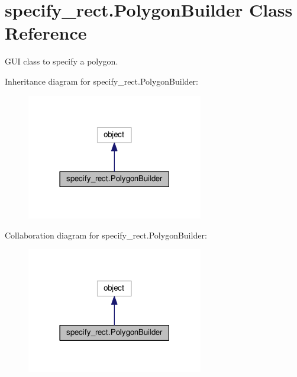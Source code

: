 \hypertarget{classspecify__rect_1_1_polygon_builder}{}\section{specify\+\_\+rect.\+Polygon\+Builder Class Reference}
\label{classspecify__rect_1_1_polygon_builder}


G\+UI class to specify a polygon.  




Inheritance diagram for specify\+\_\+rect.\+Polygon\+Builder\+:\nopagebreak
\begin{figure}[H]
\begin{center}
\leavevmode
\includegraphics[width=218pt]{classspecify__rect_1_1_polygon_builder__inherit__graph}
\end{center}
\end{figure}


Collaboration diagram for specify\+\_\+rect.\+Polygon\+Builder\+:\nopagebreak
\begin{figure}[H]
\begin{center}
\leavevmode
\includegraphics[width=218pt]{classspecify__rect_1_1_polygon_builder__coll__graph}
\end{center}
\end{figure}
